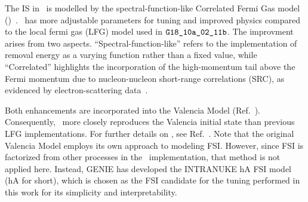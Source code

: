     The IS in \gZero\ is modelled by the spectral-function-like Correlated Fermi Gas model (\sfcfg)~\cite{sfcfg-talk,sfcfg-GitHubCommit,GENIE:2021npt}. 
    \sfcfg\ has more adjustable parameters for tuning and improved physics compared to the local fermi gas (LFG) model used in $\texttt{G18\_10a\_02\_11b}$.
    The improvment arises from two aspects. 
    ``Spectral-function-like'' refers to the implementation of removal energy as a varying function rather than a fixed value, while ``Correlated'' highlights the incorporation of the high-momentum tail above the Fermi momentum due to nucleon-nucleon short-range correlations (SRC), as evidenced by electron-scattering data~\cite{CLAS:2005ola}.

    Both enhancements are incorporated into the Valencia Model (Ref.~\cite{Nieves:2004wx}).  
    Consequently, \sfcfg\ more closely reproduces the Valencia initial state than previous LFG implementations.  
    For further details on \sfcfg, see Ref.~\cite{GENIE:2021npt}.  
    Note that the original Valencia Model employs its own approach to modeling FSI. 
    However, since FSI is factorized from other processes in the \genie\ implementation, that method is not applied here.  
    Instead, GENIE has developed the INTRANUKE hA FSI model (hA for short), which is chosen as the FSI candidate for the tuning performed in this work for its simplicity and interpretability.

